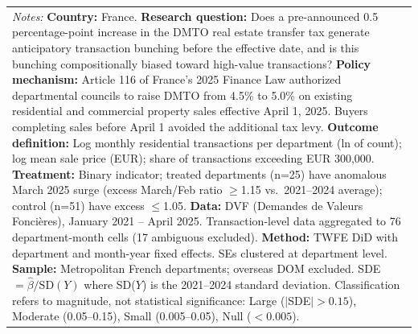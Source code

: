 \begin{table}[htbp]
\begin{tabular}{p{}}
\footnotesize \textit{Notes:} \textbf{Country:} France. \textbf{Research question:} Does a pre-announced 0.5 percentage-point increase in the DMTO real estate transfer tax generate anticipatory transaction bunching before the effective date, and is this bunching compositionally biased toward high-value transactions? \textbf{Policy mechanism:} Article 116 of France's 2025 Finance Law authorized departmental councils to raise DMTO from 4.5\% to 5.0\% on existing residential and commercial property sales effective April 1, 2025. Buyers completing sales before April 1 avoided the additional tax levy. \textbf{Outcome definition:} Log monthly residential transactions per department (ln of count); log mean sale price (EUR); share of transactions exceeding EUR 300,000. \textbf{Treatment:} Binary indicator; treated departments (n=25) have anomalous March 2025 surge (excess March/Feb ratio $\geq$1.15 vs.~2021--2024 average); control (n=51) have excess $\leq$1.05. \textbf{Data:} DVF (Demandes de Valeurs Fonci\`eres), January 2021 -- April 2025. Transaction-level data aggregated to 76 department-month cells (17 ambiguous excluded). \textbf{Method:} TWFE DiD with department and month-year fixed effects. SEs clustered at department level. \textbf{Sample:} Metropolitan French departments; overseas DOM excluded. SDE $= \hat{\beta} / \text{SD}(Y)$ where SD($Y$) is the 2021--2024 standard deviation. Classification refers to magnitude, not statistical significance: Large ($|$SDE$|>0.15$), Moderate (0.05--0.15), Small (0.005--0.05), Null ($<0.005$). \\
\end{tabular}
\end{table}
